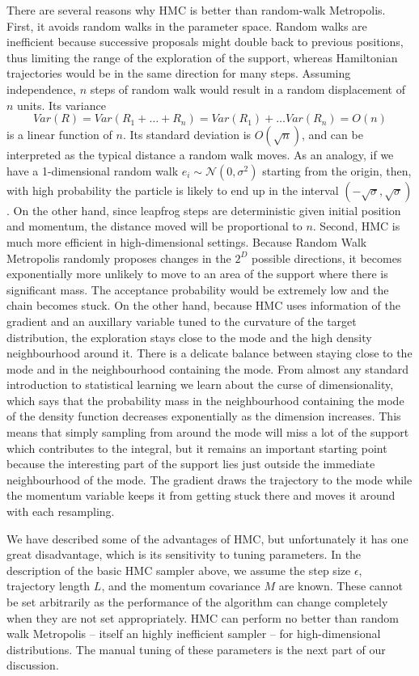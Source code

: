 \documentclass[12pt]{report}
\begin{document}
There are several reasons why HMC is better than random-walk Metropolis. First,
it avoids random walks in the parameter space. Random walks are inefficient because successive
proposals might double back to previous positions, thus limiting the range of
the exploration of the support, whereas Hamiltonian trajectories would be in the
same direction for many steps. Assuming independence, $n$ steps of random walk
would result in a random displacement of $n$ units. Its variance  
\[Var(R) = Var(R_1 + \dots + R_n) = Var(R_1) + \dots Var(R_n) = O(n) \]
is a linear function of $n$. Its standard deviation is $O(\sqrt{n})$, and can be
interpreted as the typical distance a random walk moves. As an analogy, if we
have a 1-dimensional random walk $e_i \sim \mathcal{N}(0,\sigma^2)$ starting from
the origin, then,  with high probability the particle is likely to end up in the
interval $(-\sqrt{\sigma},\sqrt{\sigma})$. 
On the other hand, since leapfrog steps are deterministic given initial position
and momentum, the distance moved will be proportional to $n$. 
Second, HMC is much more efficient in
high-dimensional settings. Because Random Walk Metropolis randomly proposes changes in
the $2^D$ possible directions, it becomes exponentially more unlikely to move
to an area of the support where there is significant mass. The acceptance
probability would be extremely low and the chain becomes stuck. On the other
hand, because HMC uses information of the gradient and an auxillary variable
tuned to the curvature of the target distribution, the exploration stays close
to the mode and the high density neighbourhood around it. There is a delicate
balance between staying close to the mode and in the neighbourhood containing
the mode. From almost any standard introduction to statistical learning \cite{friedman2001elements} we learn about the curse of dimensionality, which says that the probability mass in the neighbourhood containing the mode of the density function decreases exponentially as the dimension increases. This means that simply sampling from around the mode will miss a lot of the support which contributes to the integral, but it remains an important starting point because the interesting part of the support lies just outside the immediate neighbourhood of the mode. The gradient draws the
trajectory to
the mode while the momentum variable keeps it from getting stuck there and moves it around with each resampling.



We have described some of the advantages of HMC, but unfortunately it has one great disadvantage, which is its sensitivity to tuning parameters. 
In the description of the basic HMC sampler above, we assume the step size $\epsilon$, trajectory length $L$, and the momentum covariance $M$ are known. These cannot be set arbitrarily as the performance of the algorithm can change completely when they are not set appropriately. HMC can perform no better than random walk Metropolis -- itself an highly inefficient sampler -- for high-dimensional distributions. The manual tuning of these parameters is the next part of our discussion. 
\end{document}
